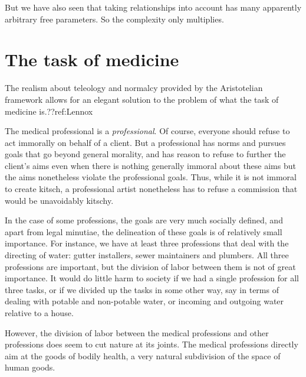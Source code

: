 But we have also seen that taking relationships into account has many apparently arbitrary free parameters. So 
the complexity only multiplies.

\section{The task of medicine}
The realism about teleology and normalcy provided by the Aristotelian framework
allows for an elegant solution to the problem of what the task of medicine is.??ref:Lennox

The medical professional is a \textit{professional}. Of course, everyone should refuse to act immorally on behalf of a client. But a professional has norms
and pursues goals that go beyond general morality, and has reason to refuse to further the client's aims even when there is nothing generally immoral about
these aims but the aims nonetheless violate the professional goals. Thus, while it is not immoral to create kitsch, a professional artist nonetheless has
to refuse a commission that would be unavoidably kitschy.

In the case of some professions, the goals are very much socially defined, and apart from legal minutiae, the delineation of these goals is of relatively
small importance. For instance, we have at least three professions that deal with the directing of water: gutter installers, sewer maintainers and plumbers.
All three professions are important, but the division of labor between them is not of great importance. It would do little harm to society if we had a single
profession for all three tasks, or if we divided up the tasks in some other way, say in terms of dealing with potable and non-potable water, or incoming
and outgoing water relative to a house.

However, the division of labor between the medical professions and other professions does seem to cut nature at its joints. The medical professions directly
aim at the goods of bodily health, a very natural subdivision of the space of human goods.

